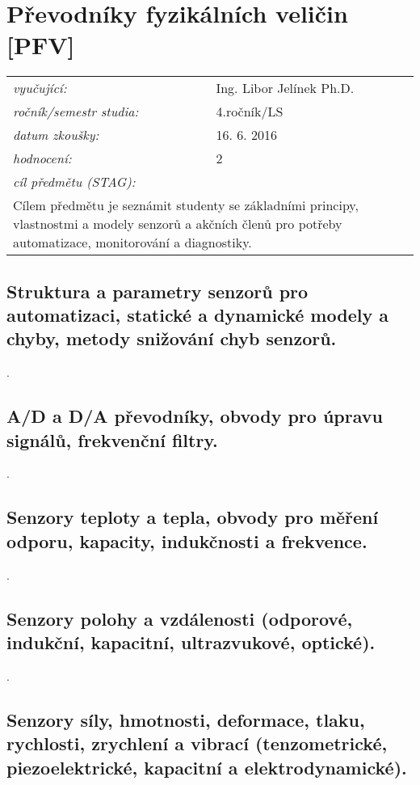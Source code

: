 \section{Převodníky fyzikálních veličin [PFV]}

\begin{table}[H]
\centering
\begin{tabular}{p{4cm} p{12cm}}
\textit{vyučující:}             & Ing. Libor Jelínek Ph.D. \\
\textit{ročník/semestr studia:} & 4.ročník/LS \\
\textit{datum zkoušky:}         & 16. 6. 2016 \\
\textit{hodnocení:}             & 2 \\
\textit{cíl předmětu (STAG):}   & \\
\multicolumn{2}{p{16cm}}{Cílem předmětu je seznámit studenty se základními principy, vlastnostmi a modely senzorů a akčních členů pro potřeby automatizace, monitorování a diagnostiky.}
\end{tabular}
\end{table}

\subsection{Struktura a parametry senzorů pro automatizaci, statické a dynamické modely a chyby, metody snižování chyb senzorů.}

\newpage . \newpage
\subsection{A/D a D/A převodníky, obvody pro úpravu signálů, frekvenční filtry.}

\newpage . \newpage
\subsection{Senzory teploty a tepla, obvody pro měření odporu, kapacity, indukčnosti a frekvence.}

\newpage . \newpage
\subsection{Senzory polohy a vzdálenosti (odporové, indukční, kapacitní, ultrazvukové, optické).}

\newpage . \newpage
\subsection{Senzory síly, hmotnosti, deformace, tlaku, rychlosti, zrychlení a vibrací (tenzometrické, piezoelektrické, kapacitní a elektrodynamické).}

